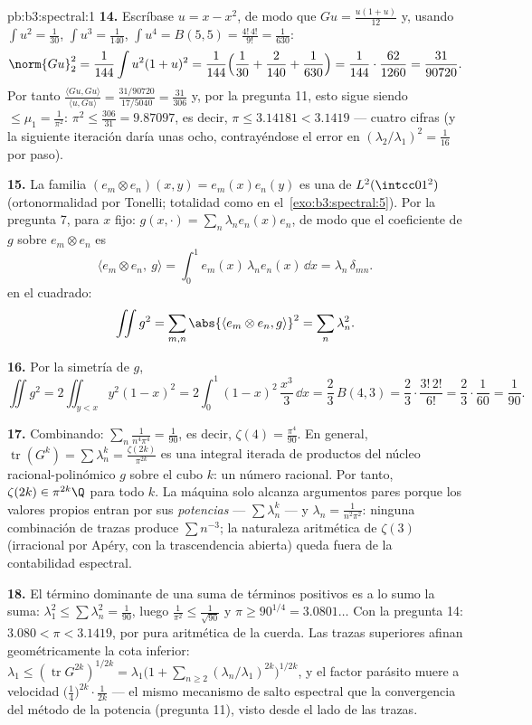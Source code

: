 \begin{solution}{pb:b3:spectral:1}
\textbf{14.} Escríbase $u = x - x^2$, de modo que $Gu =
\frac{u(1 + u)}{12}$ y, usando $\int u^2 = \frac1{30}$,
$\int u^3 = \frac1{140}$, $\int u^4 = B(5,5) =
\frac{4!\,4!}{9!} = \frac1{630}$:
\[
\norm{Gu}_2^2 = \frac1{144}\int u^2(1+u)^2 =
\frac1{144}\Bigl(\frac1{30} + \frac2{140} +
\frac1{630}\Bigr) = \frac1{144}\cdot\frac{62}{1260} =
\frac{31}{90720} .
\]
Por tanto $\frac{\langle Gu, Gu\rangle}{\langle u, Gu\rangle} =
\frac{31/90720}{17/5040} = \frac{31}{306}$ y, por la pregunta 11, esto
sigue siendo $\leq \mu_1 = \frac1{\pi^2}$: $\pi^2 \leq
\frac{306}{31} = 9.87097$, es decir, $\pi \leq 3.14181 <
3.1419$ --- cuatro cifras (y la siguiente iteración daría unas ocho,
contrayéndose el error en $(\lambda_2/\lambda_1)^2 = \frac1{16}$ por
paso).

\textbf{15.} La familia $(e_m \otimes e_n)(x,y) =
e_m(x)e_n(y)$ es una  de
$L^2(\intcc01^2)$ (ortonormalidad por Tonelli; totalidad como en
el~\cref{exo:b3:spectral:5}). Por la pregunta 7, para $x$ fijo:
$g(x, \cdot) = \sum_n\lambda_ne_n(x)e_n$, de modo que el coeficiente de
$g$ sobre $e_m\otimes e_n$ es
\[
\langle e_m\otimes e_n,\ g\rangle
= \int_0^1 e_m(x)\,\lambda_n e_n(x)\,\dd x
= \lambda_n\,\delta_{mn} .
\]
 en el cuadrado:
\[
\iint g^2 = \sum_{m,n}\abs{\langle e_m\otimes e_n,
g\rangle}^2 = \sum_n\lambda_n^2 .
\]

\textbf{16.} Por la simetría de $g$,
\[
\iint g^2 = 2\iint_{y<x}y^2(1-x)^2
= 2\int_0^1(1-x)^2\,\frac{x^3}3\,\dd x
= \frac23\,B(4, 3) = \frac23\cdot\frac{3!\,2!}{6!}
= \frac23\cdot\frac1{60} = \frac1{90} .
\]

\textbf{17.} Combinando: $\sum_n\frac1{n^4\pi^4} =
\frac1{90}$, es decir, $\zeta(4) = \frac{\pi^4}{90}$. En general,
$\operatorname{tr}(G^k) = \sum\lambda_n^k =
\frac{\zeta(2k)}{\pi^{2k}}$ es una integral iterada de productos del
núcleo racional-polinómico $g$ sobre el cubo $k$: un número racional.
Por tanto, $\zeta(2k) \in
\pi^{2k}\Q$ para todo $k$. La máquina solo alcanza argumentos pares
porque los valores propios entran por sus \emph{potencias} ---
$\sum\lambda_n^k$ --- y $\lambda_n =
\frac1{n^2\pi^2}$: ninguna combinación de trazas produce $\sum
n^{-3}$; la naturaleza aritmética de $\zeta(3)$ (irracional por Apéry,
con la trascendencia abierta) queda fuera de la contabilidad espectral.

\textbf{18.} El término dominante de una suma de términos positivos es a
lo sumo la suma: $\lambda_1^2 \leq \sum\lambda_n^2 =
\frac1{90}$, luego $\frac1{\pi^2} \leq \frac1{\sqrt{90}}$ y
$\pi \geq 90^{1/4} = 3.0801\ldots$ Con la pregunta 14:
$3.080 < \pi < 3.1419$, por pura aritmética de la cuerda. Las trazas
superiores afinan geométricamente la cota inferior:
$\lambda_1 \leq (\operatorname{tr}G^{2k})^{1/2k} =
\lambda_1\bigl(1 + \sum_{n\geq2}(\lambda_n/\lambda_1)^{2k}
\bigr)^{1/2k}$, y el factor parásito muere a velocidad
$\bigl(\tfrac14\bigr)^{2k}\cdot\frac1{2k}$ --- el mismo mecanismo de
salto espectral que la convergencia del método de la potencia (pregunta
11), visto desde el lado de las trazas.


\end{solution}
